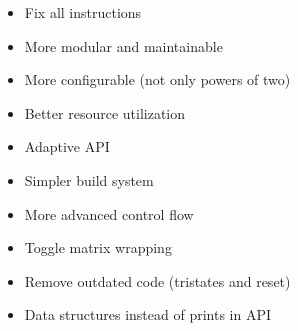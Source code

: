 \begin{itemize}
    \item Fix all instructions
    \item More modular and maintainable
    \item More configurable (not only powers of two)
    \item Better resource utilization
    \item Adaptive API
    \item Simpler build system
    \item More advanced control flow
    \item Toggle matrix wrapping
    \item Remove outdated code (tristates and reset)
    \item Data structures instead of prints in API
\end{itemize}
